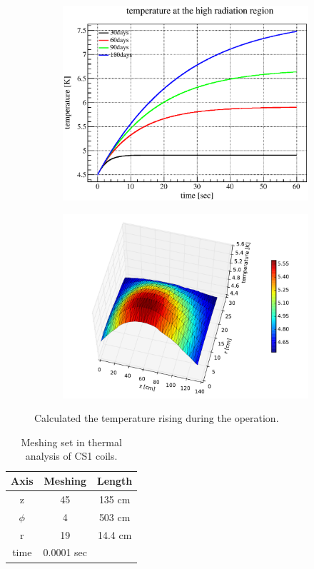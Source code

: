  \begin{figure}[H]
   \begin{subfigure}{0.3\textwidth}
    \centering
	\includegraphics[scale=0.42]{chapter5/fig/time.eps}
   \end{subfigure}
   \hspace{0.2\textwidth}
   \begin{subfigure}{0.3\textwidth}
    \centering
	\includegraphics[scale=0.42]{chapter5/fig/heatdis.pdf}
   \end{subfigure}
   \caption{Calculated the temperature rising during the operation.}
   \label{4heatdis}
  \end{figure}
 \begin{table}[H]
  \centering
  \begin{tabular}{ccc} \hline \hline
   Axis & Meshing & Length \\ \hline
   z & 45 & 135 cm \\
   $\phi$ & 4 & 503 cm \\
   r & 19 & 14.4 cm \\
   time & 0.0001 sec & \\ \hline \hline
  \end{tabular}
  \caption{Meshing set in thermal analysis of CS1 coils.}
  \label{4mesh}
 \end{table}
